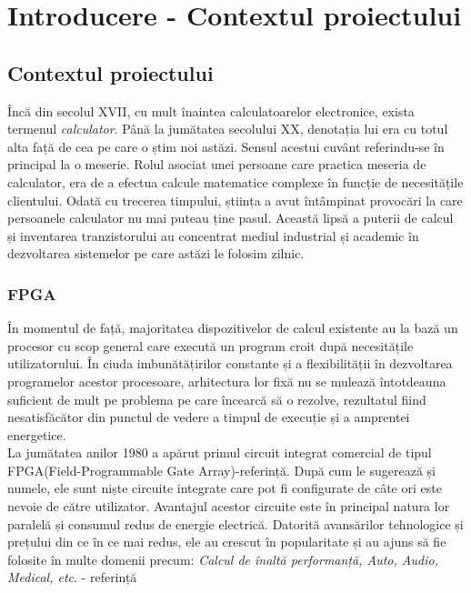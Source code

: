 \documentclass[12pt,a4paper,twoside]{report}
\begin{document}


 

\newpage

\tableofcontents
\newpage



\chapter{Introducere - Contextul proiectului}
\label{chap:intro}
\pagestyle{headings}


\section{Contextul proiectului}
Încă din secolul XVII, cu mult înaintea calculatoarelor electronice, exista termenul \textit{calculator}. Până la jumătatea secolului XX, denotația lui era cu totul alta față de cea pe care o știm noi astăzi. Sensul acestui cuvânt referindu-se în principal la o meserie. Rolul asociat unei persoane care practica meseria de calculator, era de a efectua calcule matematice complexe în funcție de necesitățile clientului. Odată cu trecerea timpului, știința a avut întâmpinat provocări la care persoanele calculator nu mai puteau ține pasul. Această lipsă a puterii de calcul și inventarea tranzistorului au concentrat mediul industrial și academic în dezvoltarea sistemelor pe care astăzi le folosim zilnic.
\subsection{FPGA}
În momentul de față, majoritatea dispozitivelor de calcul existente au la bază un procesor cu scop general care execută un program croit după necesitățile utilizatorului. În ciuda imbunătățirilor constante și a flexibilității în dezvoltarea programelor acestor procesoare, arhitectura lor fixă nu se mulează întotdeauna suficient de mult pe problema pe care încearcă să o rezolve, rezultatul fiind nesatisfăcător din punctul de vedere a timpul de execuție și a amprentei energetice.\\
La jumătatea anilor 1980 a apărut primul circuit integrat comercial de tipul FPGA(Field-Programmable Gate Array)-referință. După cum le sugerează și numele, ele sunt niște circuite integrate care pot fi configurate de câte ori este nevoie de către utilizator. Avantajul acestor circuite este în principal natura lor paralelă și consumul redus de energie electrică. Datorită avansărilor tehnologice și prețului din ce în ce mai redus, ele au crescut în popularitate și au ajuns să fie folosite în multe domenii precum: \textit{Calcul de înaltă performanță, Auto, Audio, Medical, etc}. - referință
\end{document}
